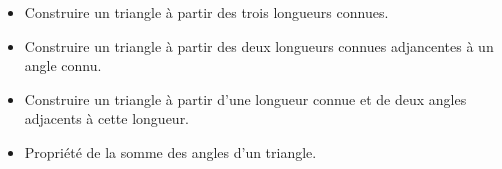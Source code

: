 \begin{prerequis}[Prérequis]    
    \begin{itemize}
        \item Construire un triangle à partir des trois longueurs connues.
        \item Construire un triangle à partir des deux longueurs connues adjancentes à un angle connu.
        \item Construire un triangle à partir d'une longueur connue et de deux angles adjacents à cette longueur.
        \item Propriété de la somme des angles d'un triangle.
    \end{itemize}
\end{prerequis}
